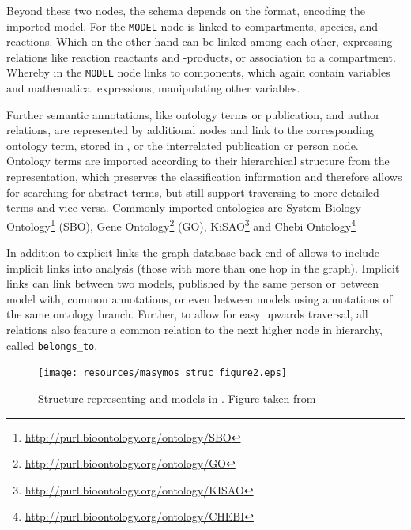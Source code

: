 Beyond these two nodes, the schema depends on the format, encoding the imported model. For \sbml the \texttt{MODEL} node is linked to compartments, species, and reactions. Which on the other hand can be linked among each other, expressing relations like reaction reactants and -products, or association to a compartment.
Whereby in \cellml the \texttt{MODEL} node links to components, which again contain variables and mathematical expressions, manipulating other variables.

Further semantic annotations, like ontology terms or publication, and author relations, are represented by additional nodes and link to the corresponding ontology term, stored in \neoj, or the interrelated publication or person node. 
Ontology terms are imported according to their hierarchical structure from the \owl representation, which preserves the classification information and therefore allows for searching for abstract terms, but still support traversing to more detailed terms and vice versa.
Commonly imported ontologies are System Biology Ontology\footnote{\url{http://purl.bioontology.org/ontology/SBO}} (SBO), Gene Ontology\footnote{\url{http://purl.bioontology.org/ontology/GO}} (GO), KiSAO\footnote{\url{http://purl.bioontology.org/ontology/KISAO}} and Chebi Ontology\footnote{\url{http://purl.bioontology.org/ontology/CHEBI}}

In addition to explicit links the graph database back-end of \masymos allows to include implicit links into analysis (those with more than one hop in the graph). Implicit links can link between two models, published by the same person or between model with, common annotations, or even between models using annotations of the same ontology branch.
Further, to allow for easy upwards traversal, all relations also feature a common relation to the next higher node in hierarchy, called \texttt{belongs\_to}.

\begin{figure}
	\centering
	\texttt{[image: resources/masymos\_struc\_figure2.eps]}
	\caption{Structure representing \sbml and \cellml models in \masymos. Figure taken from \citealt{Henkel2015}}
	\label{fig:background:graph-db:masymos}
\end{figure}

